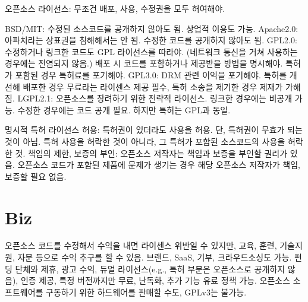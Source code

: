   \itm 오픈소스 라이선스: 무조건 배포, 사용, 수정권을 모두 허여해야.

  \bitmz
    \itm BSD/MIT: 수정된 소스코드를 공개하지 않아도 됨. 상업적 이용도 가능.
    \itm Apache2.0: 아파치라는 상표권을 침해해서는 안 됨. 수정한 코드를 공개하지 않아도 됨.
    \itm GPL2.0: 수정하거나 링크한 코드도 GPL 라이선스를 따라야. (네트워크 통신을 거쳐 사용하는 경우에는 전염되지 않음.) 배포 시 코드를 포함하거나 제공받을 방법을 명시해야. 특허가 포함된 경우 특허료를 포기해야.
    \itm GPL3.0: DRM 관련 이익을 포기해야. 특허를 개선해 배포한 경우 무료라는 라이센스 제공 필수, 특허 소송을 제기한 경우 제재가 가해짐.
    \itm LGPL2.1: 오픈소스를 장려하기 위한 전략적 라이선스. 링크한 경우에는 비공개 가능. 수정한 경우에는 코드 공개 필요. 하지만 특허는 GPL과 동일.
  \eitmz

  \itm 명시적 특허 라이선스 허용: 특허권이 있더라도 사용을 허용. 단, 특허권이 무효가 되는 것이 아님. 특허 사용을 허락한 것이 아니라, 그 특허가 포함된 소스코드의 사용을 허락한 것.
  \itm 책임의 제한, 보증의 부인: 오픈소스 저작자는 책임과 보증을 부인할 권리가 있음. 오픈소스 코드가 포함된 제품에 문제가 생기는 경우 해당 오픈소스 저작자가 책임, 보증할 필요 없음.
\eitmz

\section{Biz}

\bitmz
  \itm 오픈소스 코드를 수정해서 수익을 내면 라이센스 위반일 수 있지만, 교육, 훈련, 기술지원, 자문 등으로 수익 추구를 할 수 있음. 브랜드, SaaS, 기부, 크라우드소싱도 가능.
  \itm 펀딩 단체와 제휴, 광고 수익, 듀얼 라이선스(e.g., 특허 부분은 오픈소스로 공개하지 않음), 인증 제공, 특정 버전까지만 무료, 난독화, 추가 기능 유료 정책 가능.
  \itm 오픈소스 소프트웨어를 구동하기 위한 하드웨어를 판매할 수도, GPLv3는 불가능.
\eitmz
